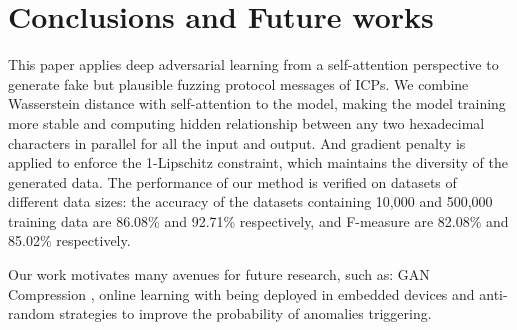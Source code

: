 \section{Conclusions and Future works}

This paper applies deep adversarial learning from a self-attention perspective to generate fake but plausible fuzzing protocol messages of ICPs. We combine Wasserstein distance with self-attention to the model, making the model training more stable and computing hidden relationship between any two hexadecimal characters in parallel for all the input and output. And gradient penalty is applied to enforce the 1-Lipschitz constraint, which maintains the diversity of the generated data. The performance of our method is verified on datasets of different data sizes: the accuracy of the datasets containing 10,000 and 500,000 training data are 86.08\% and 92.71\% respectively, and F-measure are 82.08\% and 85.02\% respectively.

Our work motivates many avenues for future research, such as: GAN Compression \cite{li2020gan}, online learning with being deployed in embedded devices and anti-random strategies to improve the probability of anomalies triggering.


